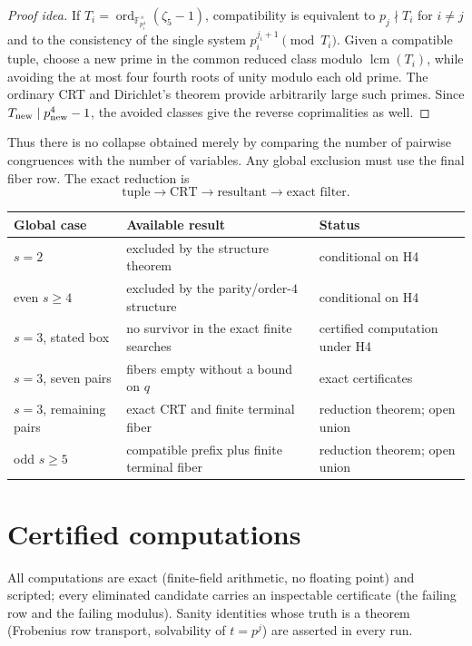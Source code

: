\documentclass[11pt]{amsart}
\theoremstyle{definition}
\theoremstyle{remark}
\newcommand{\F}{\mathbb{F}}
\newcommand{\ord}{\operatorname{ord}}
\newcommand{\lcm}{\operatorname{lcm}}
\begin{document}
\begin{proof}[Proof idea]
If \(T_i=\ord_{\F_{p_i^4}^\times}(\zeta_5-1)\), compatibility is equivalent
to \(p_j\nmid T_i\) for \(i\ne j\) and to the consistency of the single
system \(p_i^{j_i+1}\pmod{T_i}\). Given a compatible tuple, choose a new
prime in the common reduced class modulo \(\lcm(T_i)\), while avoiding the
at most four fourth roots of unity modulo each old prime. The ordinary CRT
and Dirichlet's theorem provide arbitrarily large such primes. Since
\(T_{\rm new}\mid p_{\rm new}^4-1\), the avoided classes give the reverse
coprimalities as well.
\end{proof}

Thus there is no collapse obtained merely by comparing the number of
pairwise congruences with the number of variables. Any global exclusion
must use the final fiber row. The exact reduction is
\[
\text{tuple}\longrightarrow\text{CRT}\longrightarrow
\text{resultant}\longrightarrow\text{exact filter}.
\]

\begin{center}
\begin{tabular}{@{}
  >{\raggedright\arraybackslash}p{}
  >{\raggedright\arraybackslash}p{}
  >{\raggedright\arraybackslash}p{}
@{}}
\hline
Global case & Available result & Status\\
\hline
\(s=2\) & excluded by the structure theorem & conditional on H4\\
even \(s\ge4\) & excluded by the parity/order-\(4\) structure &
conditional on H4\\
\(s=3\), stated box & no survivor in the exact finite searches &
certified computation under H4\\
\(s=3\), seven pairs & fibers empty without a bound on \(q\) &
exact certificates\\
\(s=3\), remaining pairs & exact CRT and finite terminal fiber &
reduction theorem; open union\\
odd \(s\ge5\) & compatible prefix plus finite terminal fiber &
reduction theorem; open union\\
\hline
\end{tabular}
\end{center}

\section{Certified computations}\label{sec:computations}

All computations are exact (finite-field arithmetic, no floating point) and
scripted; every eliminated candidate carries an inspectable certificate
(the failing row and the failing modulus). Sanity identities whose truth is
a theorem (Frobenius row transport, solvability of $t = p^j$) are asserted
in every run.
\end{document}
